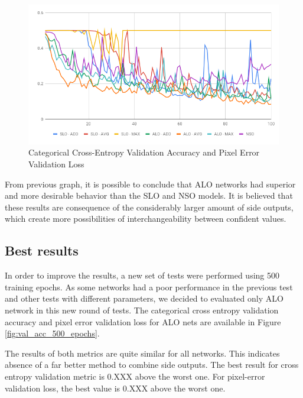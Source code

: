 \begin{figure}
  \caption{Categorical Cross-Entropy Validation Accuracy and Pixel Error Validation Loss}
  \centering
    \includegraphics[width=1.\columnwidth]{figures/falreis/pixel_error.png}
  
  \label{fig:validation_accuracy_pixel_error}
\end{figure}

From previous graph, it is possible to conclude that ALO networks had superior and more desirable behavior than the SLO and NSO models. It is believed that these results are consequence of the considerably larger amount of side outputs, which create more possibilities of interchangeability between confident values.

\subsection{Best results}

In order to improve the results, a new set of tests were performed using 500 training epochs. As some networks had a poor performance in the previous test and other tests with different parameters, we decided to evaluated only ALO network in this new round of tests. The categorical cross entropy validation accuracy and pixel error validation loss for ALO nets are available in Figure \ref{fig:val_acc_500_epochs}.

The results of both metrics are quite similar for all networks. This indicates absence of a far better method to combine side outputs. {\color{red}The best result for cross entropy validation metric is 0.XXX above the worst one. For pixel-error validation loss, the best value is 0.XXX above the worst one.}

